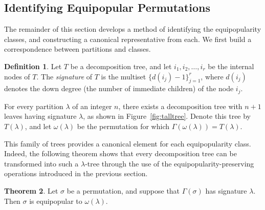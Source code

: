 \documentclass[10pt]{article}
\theoremstyle{definition}
\newtheorem{theorem}{Theorem}[section]
\newtheorem{definition}[theorem]{Definition}
\numberwithin{equation}{section}
\numberwithin{figure}{section}
\begin{document}
%



\subsection{Identifying Equipopular Permutations}

The remainder of this section develops a method of identifying the equipopularity classes, and constructing a canonical representative from each.  We first build a correspondence between partitions and classes. 

\begin{definition}
Let $T$ be a decomposition tree, and let $i_1, i_2, \dots, i_r$ be the internal nodes of $T$.  The \emph{signature} of $T$ is the multiset $\{d(i_j) - 1\}_{j=1}^r$, where $d(i_j)$ denotes the down degree (the number of immediate children) of the node $i_j$. 
\end{definition}
  
For every partition $\lambda$ of an integer $n$, there exists a decomposition tree with $n+1$ leaves having signature $\lambda$, as shown in Figure~\ref{fig:talltree}. Denote this tree by $T(\lambda)$, and let $\omega(\lambda)$ be the permutation for which $\Gamma(\omega(\lambda)) = T(\lambda)$. 

This family of trees provides a canonical element for each equipopularity class. Indeed, the following theorem shows that every decomposition tree can be transformed into such a $\lambda$-tree through the use of the equipopularity-preserving operations introduced in the previous section. 

\begin{theorem}
Let $\sigma$ be a permutation, and suppose that $\Gamma(\sigma)$ has signature $\lambda$. Then $\sigma$ is equipopular to $\omega(\lambda)$. 
\end{theorem}
\end{document}
